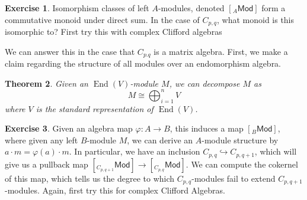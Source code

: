 \documentclass[psamsfonts]{amsart}
\newtheorem{thm}{Theorem}[section]
\theoremstyle{definition}
\newtheorem{exer}[thm]{Exercise}
\theoremstyle{remark}
\DeclareMathOperator{\End}{End}
\begin{document}
%
\begin{exer}
Isomorphism classes of left $A$-modules, denoted $[ _A \mathsf{Mod} ]$ form a commutative monoid under direct sum. In the case of $C_{p,q}$, what monoid is this isomorphic to? First try this with complex Clifford algebras
\end{exer}
We can answer this in the case that $C_{p.q}$ is a matrix algebra. First, we make a claim regarding the structure of all modules over an endomorphism algebra.
%
\begin{thm}
Given an $\End(V)$-module $M$, we can decompose $M$ as 
$$M \cong \bigoplus_{i=1}^n V $$
where $V$ is the standard representation of $\End(V)$.
\end{thm}
%
\begin{exer}
Given an algebra map $\varphi: A \to B$, this induces a map $[ _B \mathsf{Mod}]$, where given any left $B$-module $M$, we can derive an $A$-module structure by $a \cdot m = \varphi(a) \cdot m$. In particular, we have an inclusion $C_{p,q} \hookrightarrow C_{p,q+1}$, which will give us a pullback map $[ _{C_{p,q+1}}\mathsf{Mod} ] \to [ _{C_{p,q}}\mathsf{Mod}]$. We can compute the cokernel of this map, which tells us the degree to which $C_{p,q}$-modules fail to extend $C_{p,q+1}$-modules. Again, first try this for complex Clifford Algebras.
\end{exer}
%
\end{document}
